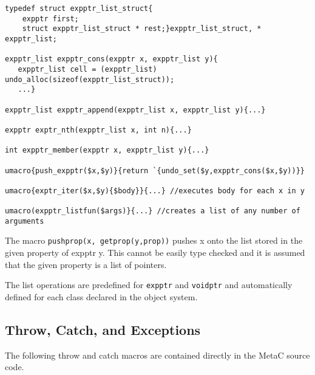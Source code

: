 \documentclass{article}
\begin{document}
\begin{verbatim}
typedef struct expptr_list_struct{
    expptr first;
    struct expptr_list_struct * rest;}expptr_list_struct, * expptr_list;

expptr_list expptr_cons(expptr x, expptr_list y){
   expptr_list cell = (expptr_list) undo_alloc(sizeof(expptr_list_struct));
   ...}

expptr_list expptr_append(expptr_list x, expptr_list y){...}

expptr exptr_nth(expptr_list x, int n){...}

int expptr_member(expptr x, expptr_list y){...}

umacro{push_expptr($x,$y)}{return `{undo_set($y,expptr_cons($x,$y))}}

umacro{exptr_iter($x,$y){$body}}{...} //executes body for each x in y

umacro(expptr_listfun($args)}{...} //creates a list of any number of arguments
\end{verbatim}

The macro {\tt pushprop(x, getprop(y,prop))} pushes x onto the list stored in the given property of expptr y.  This cannot be easily type
checked and it is assumed that the given property is a list of pointers.

The list operations are predefined for {\tt expptr} and {\tt voidptr} and automatically defined for each class declared in the object system.


\subsection{Throw, Catch, and Exceptions}

The following throw and catch macros are contained directly in the MetaC source code.
\end{document}
